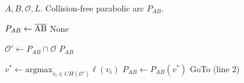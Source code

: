 
\begin{algorithm}[t!]
\caption{Given the suspension points $A$ and $B$, and a set of polygons $\mathcal{O}$ inside $T$, %
returns, if it exists, a collision-free parabolic arc $P_{AB}$ with maximum length $L$. 
$P_{AB}$ cannot touch the ground.
}
\label{alg:decision_problem}
\begin{algorithmic}[1]
\Require $A, B, \mathcal{O}, L$.
\Ensure Collision-free parabolic arc $P_{AB}$.

 \State $P_{AB} \gets \overline{\rm AB}$
    \State \Return None %
\EndIf

\State $\mathcal{O}' \gets P_{AB} \cap \mathcal{O}$
    \State \Return $P_{AB}$
\EndIf

\State $v^* \gets \text{argmax}_{v_i \in CH(\mathcal{O}')}\ell(v_i)$
\State $P_{AB} \gets P_{AB}(v^*)$
\State GoTo (line 2)
\end{algorithmic}  
\end{algorithm}

